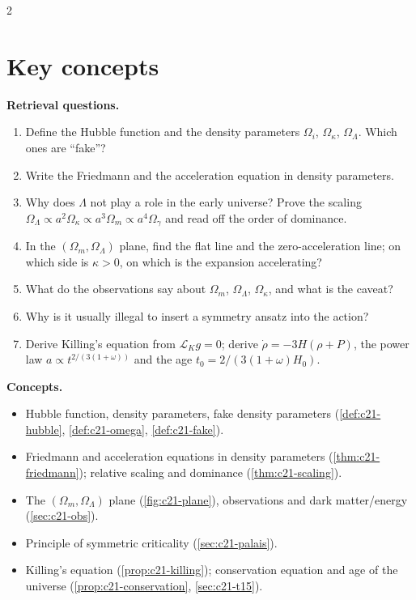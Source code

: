 \begin{paracol}{2}
\section*{Key concepts}
\begin{keyconcepts}
\textbf{Retrieval questions.}
\begin{enumerate}
  \item Define the Hubble function and the density parameters $\Omega_i$, $\Omega_\kappa$, $\Omega_\Lambda$. Which ones are ``fake''?
  \item Write the Friedmann and the acceleration equation in density parameters.
  \item Why does $\Lambda$ not play a role in the early universe? Prove the scaling $\Omega_\Lambda\propto a^2\Omega_\kappa\propto a^3\Omega_m\propto a^4\Omega_\gamma$ and read off the order of dominance.
  \item In the $(\Omega_m,\Omega_\Lambda)$ plane, find the flat line and the zero-acceleration line; on which side is $\kappa>0$, on which is the expansion accelerating?
  \item What do the observations say about $\Omega_m$, $\Omega_\Lambda$, $\Omega_\kappa$, and what is the caveat?
  \item Why is it usually illegal to insert a symmetry ansatz into the action?
  \item Derive Killing's equation from $\mathcal L_Kg=0$; derive $\dot\rho=-3H(\rho+P)$, the power law $a\propto t^{2/(3(1+\omega))}$ and the age $t_0=2/(3(1+\omega)H_0)$.
\end{enumerate}
\textbf{Concepts.}
\begin{itemize}
  \item Hubble function, density parameters, fake density parameters (\cref{def:c21-hubble}, \cref{def:c21-omega}, \cref{def:c21-fake}).
  \item Friedmann and acceleration equations in density parameters (\cref{thm:c21-friedmann}); relative scaling and dominance (\cref{thm:c21-scaling}).
  \item The $(\Omega_m,\Omega_\Lambda)$ plane (\cref{fig:c21-plane}), observations and dark matter/energy (\cref{sec:c21-obs}).
  \item Principle of symmetric criticality (\cref{sec:c21-palais}).
  \item Killing's equation (\cref{prop:c21-killing}); conservation equation and age of the universe (\cref{prop:c21-conservation}, \cref{sec:c21-t15}).
\end{itemize}
\end{keyconcepts}

\flushside
\end{paracol}

